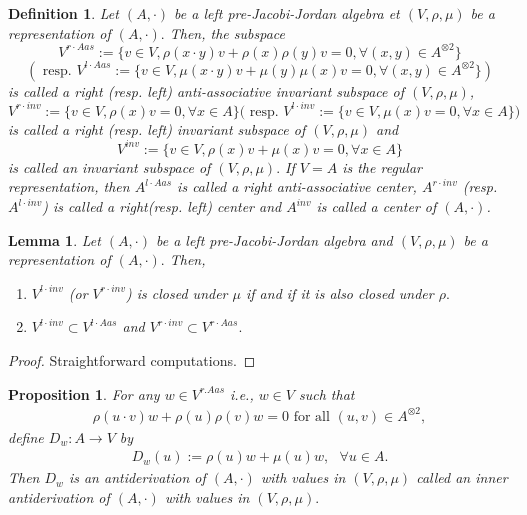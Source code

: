 \documentclass[12pt]{amsart}
\newtheorem{definition}[Theorem]{Definition}
\newtheorem{lemma}[Theorem]{Lemma}
\newtheorem{proposition}[Theorem]{Proposition}
\begin{document}
	\begin{definition}
		Let $(A,\cdot)$ be a left pre-Jacobi-Jordan algebra et $(V,\rho,\mu)$ be a representation of $(A,\cdot).$ Then, the subspace
		$$V^{r\cdot Aas}:=\{v\in V,\rho(x\cdot y)v+\rho(x)\rho(y)v=0, \forall (x,y)\in A^{\otimes 2}\}$$
		$$(\mbox{ resp. $V^{l\cdot Aas}:=\{v\in V,\mu(x\cdot y)v+\mu(y)\mu(x)v=0, \forall (x,y)\in A^{\otimes 2}\}$} )$$
		is called a right (resp. left) anti-associative invariant subspace of $(V,\rho,\mu)$,
		$$V^{r\cdot inv}:=\{v\in V,\rho(x)v=0, \forall x\in A\} \mbox{( resp. $V^{l\cdot inv}:=\{v\in V,\mu(x)v=0, \forall x\in A\} )$ }$$ is called a right (resp. left)  invariant  subspace of $(V,\rho,\mu)$ and
		$$V^{inv}:=\{v\in V,\rho(x)v+\mu(x)v=0, \forall x\in A\}$$
		is called an  invariant  subspace of $(V,\rho,\mu).$ If $V=A$ is the regular representation, then $A^{l\cdot Aas}$ is called a right anti-associative center, $A^{r\cdot inv}$
		(resp. $A^{l\cdot inv}$) is called a right(resp. left) center and $A^{ inv}$ is called a center of $(A,\cdot)$.
	\end{definition}
	\begin{lemma}
		Let $(A,\cdot)$ be a left pre-Jacobi-Jordan algebra and $(V,\rho,\mu)$ be a representation of $(A,\cdot).$ Then,
		\begin{enumerate}
			\item $V^{l\cdot inv}$ (or $V^{r\cdot inv}$) is closed under $\mu$ if and if it is also closed under $\rho.$
			\item $V^{l\cdot inv}\subset V^{l\cdot Aas}$ and  $V^{r\cdot inv}\subset V^{r\cdot Aas}.$
		\end{enumerate}	
	\end{lemma}
	\begin{proof}
		Straightforward computations.
	\end{proof}
	\begin{proposition}\label{inderAV}
		For any $w\in V^{r.Aas}$ i.e., $w\in V$ such that
		\begin{eqnarray}
			\rho(u\cdot v)w+\rho(u)\rho(v)w=0 \mbox{ for all $(u,v)\in A^{\otimes 2} $},\label{vid1}
		\end{eqnarray}
		define 
		$D_w: A\rightarrow V $ by
		\begin{eqnarray}
			D_w(u):=\rho(u)w+\mu(u)w, \mbox{    $\forall u\in A$}.\label{vid2}
		\end{eqnarray}
		Then $D_w$ is an antiderivation of $(A,\cdot)$ with values in $(V,\rho,\mu)$ called an inner antiderivation of $(A,\cdot)$ with values in $(V,\rho,\mu).$
	\end{proposition}
\end{document}
